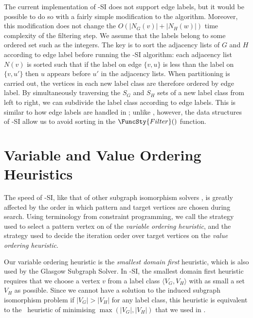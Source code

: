 The current implementation of \McSplit-SI does not support edge labels, but it
would be possible to do so with a fairly simple modification to the algorithm.
Moreover, this modification does not change the
$O(|N_G(v)| + |N_H(w)|)$ time complexity of the filtering step.  We assume that
the labels belong to some ordered set such as the integers.  The key is to sort
the adjacency lists of $G$ and $H$ according to edge label before running the \McSplit-SI
algorithm: each adjacency list $N(v)$ is sorted such that if the label on edge
$\{v,u\}$ is less than the label on $\{v,u'\}$ then $u$ appears before $u'$ in
the adjacency lists.  When partitioning is carried out, the
vertices in each new label class are therefore ordered by edge label.
By simultaneously
traversing the $S_G$ and $S_H$ sets of a new label class from left to right, we
can subdivide the label class according to edge labels.  This is similar to how
edge labels are handled in \McSplit; unlike \McSplit, however, the
data structures of \McSplit-SI allow us to avoid sorting in the $\FuncSty{Filter}()$
function.

\section{Variable and Value Ordering Heuristics}\label{sec:mcsplit-si-heuristics}

The speed of \McSplit-SI, like that of other subgraph isomorphism solvers
\citep{DBLP:journals/tcbb/BonniciG17,DBLP:journals/jair/McCreeshPST18},
is greatly affected by the order
in which pattern and target vertices are chosen during search.
Using terminology from constraint programming, we call the strategy
used to select a pattern vertex on  of
 the \emph{variable ordering heuristic}, and the
strategy used to decide the iteration order over target vertices on
 the \emph{value ordering heuristic}.

Our variable ordering heuristic is the \emph{smallest domain first} heuristic,
which is also used by the Glasgow Subgraph Solver.
In \McSplit-SI, the smallest domain first heuristic requires
that we choose a vertex $v$ from a label class $\langle V_G, V_H \rangle$ with
as small a set $V_H$ as possible.  Since we cannot have a solution
to the induced subgraph isomorphism problem
if $|V_G|>|V_H|$ for any label class, this heuristic is equivalent
to the \McSplit\ heuristic of minimising $\max(|V_G|,|V_H|)$ that we
used in .


